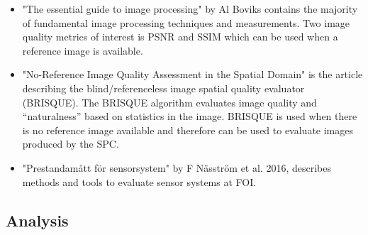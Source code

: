 \begin{itemize}

\item \cite{book:image_processing} "The essential guide to image processing" by Al Boviks contains the majority of fundamental image processing techniques and measurements. Two image quality metrics of interest is PSNR and SSIM which can be used when a reference image is available.
    
\item \cite{article:brisque} "No-Reference Image Quality Assessment
in the Spatial Domain" is the article describing the blind/referenceless image spatial quality evaluator (BRISQUE). The BRISQUE algorithm evaluates image quality and “naturalness” based on statistics in the image. BRISQUE is used when there is no reference image available and therefore can be used to evaluate images produced by the SPC.  
    
\item \cite{article:FOI_pres_sens} "Prestandamått för sensorsystem" by F Näsström et al. 2016, describes methods and tools to evaluate sensor systems at FOI. 
    
\end{itemize}



\subsection{Analysis}